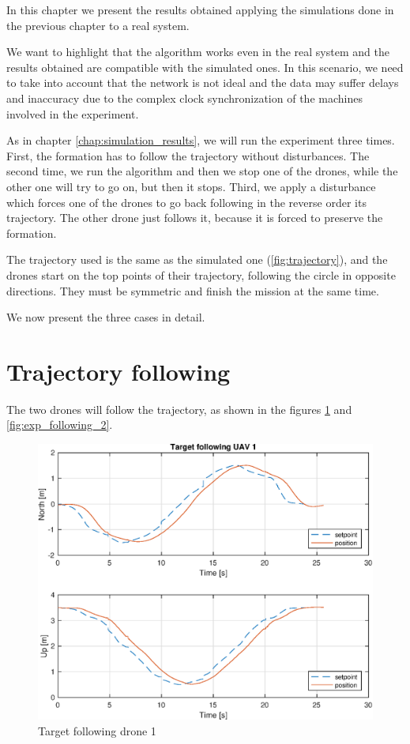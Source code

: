 In this chapter we present the results obtained applying the simulations done in the
previous chapter to a real system.

We want to highlight that the algorithm works even in the real system
and the results obtained are compatible with the simulated ones.
In this scenario, we need to take into account that the network is not ideal and
the data may suffer delays and inaccuracy due to the complex clock synchronization
of the machines involved in the experiment.

As in chapter \ref{chap:simulation_results}, we will run the experiment three times.
First, the formation has to follow the trajectory without disturbances.
The second time, we run the algorithm and then we stop one of the drones, while the other one
will try to go on, but then it stops.
Third, we apply a disturbance which forces one of the drones to go back following
in the reverse order its trajectory. The other drone just follows it, because it is
forced to preserve the formation.

The trajectory used is the same as the simulated one (\ref{fig:trajectory}), and
the drones start on the top points of their trajectory, following the circle in opposite
directions.
They must be symmetric and finish the mission at the same time.

We now present the three cases in detail.

\section{Trajectory following}
The two drones will follow the trajectory, as shown in the figures \ref{fig:exp_following_1}
and \ref{fig:exp_following_2}.

\begin{figure}
\centering
\includegraphics[width=0.7\linewidth]{chapters/chapter-05/figures/following_1.eps}
\caption{Target following drone 1}
\label{fig:exp_following_1}
\end{figure}

